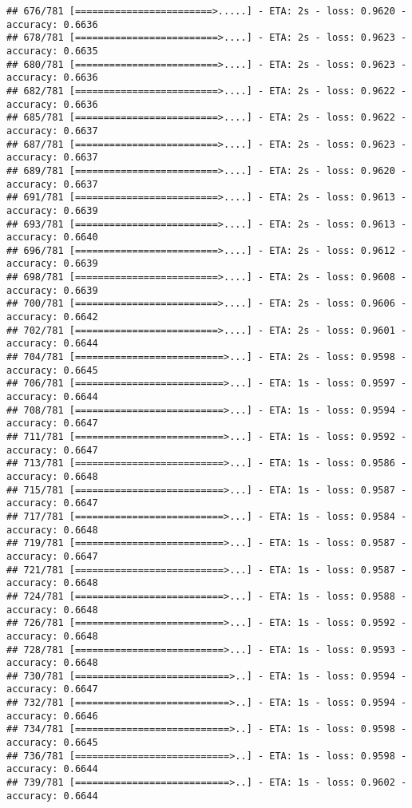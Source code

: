 \documentclass[
]{article}
\begin{document}
\begin{verbatim}
## 676/781 [========================>.....] - ETA: 2s - loss: 0.9620 - accuracy: 0.6636
## 678/781 [=========================>....] - ETA: 2s - loss: 0.9623 - accuracy: 0.6635
## 680/781 [=========================>....] - ETA: 2s - loss: 0.9623 - accuracy: 0.6636
## 682/781 [=========================>....] - ETA: 2s - loss: 0.9622 - accuracy: 0.6636
## 685/781 [=========================>....] - ETA: 2s - loss: 0.9622 - accuracy: 0.6637
## 687/781 [=========================>....] - ETA: 2s - loss: 0.9623 - accuracy: 0.6637
## 689/781 [=========================>....] - ETA: 2s - loss: 0.9620 - accuracy: 0.6637
## 691/781 [=========================>....] - ETA: 2s - loss: 0.9613 - accuracy: 0.6639
## 693/781 [=========================>....] - ETA: 2s - loss: 0.9613 - accuracy: 0.6640
## 696/781 [=========================>....] - ETA: 2s - loss: 0.9612 - accuracy: 0.6639
## 698/781 [=========================>....] - ETA: 2s - loss: 0.9608 - accuracy: 0.6639
## 700/781 [=========================>....] - ETA: 2s - loss: 0.9606 - accuracy: 0.6642
## 702/781 [=========================>....] - ETA: 2s - loss: 0.9601 - accuracy: 0.6644
## 704/781 [==========================>...] - ETA: 2s - loss: 0.9598 - accuracy: 0.6645
## 706/781 [==========================>...] - ETA: 1s - loss: 0.9597 - accuracy: 0.6644
## 708/781 [==========================>...] - ETA: 1s - loss: 0.9594 - accuracy: 0.6647
## 711/781 [==========================>...] - ETA: 1s - loss: 0.9592 - accuracy: 0.6647
## 713/781 [==========================>...] - ETA: 1s - loss: 0.9586 - accuracy: 0.6648
## 715/781 [==========================>...] - ETA: 1s - loss: 0.9587 - accuracy: 0.6647
## 717/781 [==========================>...] - ETA: 1s - loss: 0.9584 - accuracy: 0.6648
## 719/781 [==========================>...] - ETA: 1s - loss: 0.9587 - accuracy: 0.6647
## 721/781 [==========================>...] - ETA: 1s - loss: 0.9587 - accuracy: 0.6648
## 724/781 [==========================>...] - ETA: 1s - loss: 0.9588 - accuracy: 0.6648
## 726/781 [==========================>...] - ETA: 1s - loss: 0.9592 - accuracy: 0.6648
## 728/781 [==========================>...] - ETA: 1s - loss: 0.9593 - accuracy: 0.6648
## 730/781 [===========================>..] - ETA: 1s - loss: 0.9594 - accuracy: 0.6647
## 732/781 [===========================>..] - ETA: 1s - loss: 0.9594 - accuracy: 0.6646
## 734/781 [===========================>..] - ETA: 1s - loss: 0.9598 - accuracy: 0.6645
## 736/781 [===========================>..] - ETA: 1s - loss: 0.9598 - accuracy: 0.6644
## 739/781 [===========================>..] - ETA: 1s - loss: 0.9602 - accuracy: 0.6644

\end{verbatim}
\end{document}
